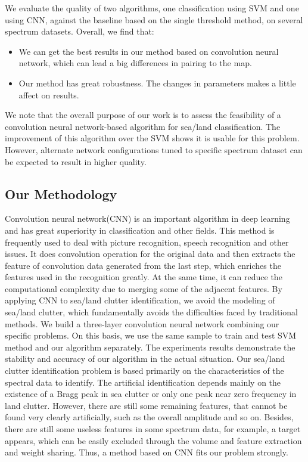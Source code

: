 We evaluate the quality of two algorithms, one classification using SVM and one using CNN, against the baseline based on the single threshold method, on several spectrum datasets. Overall, we find that:

\begin{itemize}
	\item We can get the best results in our method based on convolution neural network, which can lead a big differences in pairing to the map.
	\item Our method has great robustness. The changes in parameters makes a little affect on results.
\end{itemize}
We note that the overall purpose of our work is to assess the feasibility of a convolution neural network-based algorithm for sea/land classification. The improvement of this algorithm over the SVM shows it is usable for this problem. However, alternate network configurations tuned to specific spectrum dataset can be expected to result in higher quality.



\subsection{Our Methodology}
Convolution neural network(CNN) is an important algorithm in deep learning and has great superiority in classification and other fields. This method is frequently used to deal with picture recognition, speech recognition and other issues. It does convolution operation for the original data and then extracts the feature of convolution data generated from the last step, which enriches the features used in the recognition greatly. At the same time, it can reduce the computational complexity due to merging some of the adjacent features. By applying CNN to sea/land clutter identification, we avoid the modeling of sea/land clutter, which fundamentally avoids the difficulties faced by traditional methods. We build a three-layer convolution neural network combining our specific problems. On this basis, we use the same sample to train and test SVM method and our algorithm separately. The experiments results demonstrate the stability and accuracy of our algorithm in the actual situation. Our sea/land clutter identification problem is based primarily on the characteristics of the spectral data to identify. The artificial identification depends mainly on the existence of a Bragg peak in sea clutter or only one peak near zero frequency in land clutter. However, there are still some remaining features, that cannot be found very clearly artificially, such as the overall amplitude and so on. Besides, there are still some useless features in some spectrum data, for example, a target appears, which can be easily excluded through the volume and feature extraction and weight sharing. Thus, a method based on CNN fits our problem strongly.

